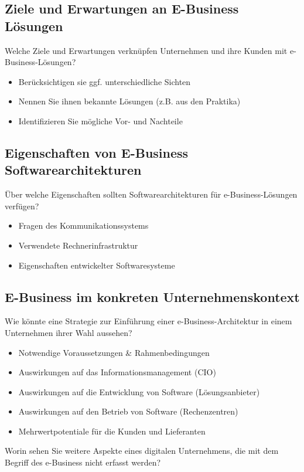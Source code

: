 \documentclass[notitlepage, hidelinks]{article}
\begin{document}
\subsection{Ziele und Erwartungen an E-Business Lösungen}
Welche Ziele und Erwartungen verknüpfen Unternehmen und ihre Kunden mit e-Business-Lösungen?
\begin{itemize}
\item Berücksichtigen sie ggf. unterschiedliche Sichten
\item Nennen Sie ihnen bekannte Lösungen (z.B. aus den Praktika)
\item Identifizieren Sie mögliche Vor- und Nachteile
\end{itemize}

\subsection{Eigenschaften von E-Business Softwarearchitekturen}
Über welche Eigenschaften sollten Softwarearchitekturen für e-Business-Lösungen verfügen?
\begin{itemize}
\item Fragen des Kommunikationssystems
\item Verwendete Rechnerinfrastruktur
\item Eigenschaften entwickelter Softwaresysteme
\end{itemize}

\subsection{E-Business im konkreten Unternehmenskontext}
Wie könnte eine Strategie zur Einführung einer e-Business-Architektur in einem Unternehmen ihrer Wahl aussehen?
\begin{itemize}
\item Notwendige Voraussetzungen \& Rahmenbedingungen
\item Auswirkungen auf das Informationsmanagement (CIO)
\item Auswirkungen auf die Entwicklung von Software (Lösungsanbieter)
\item Auswirkungen auf den Betrieb von Software (Rechenzentren)
\item Mehrwertpotentiale für die Kunden und Lieferanten
\end{itemize}

Worin sehen Sie weitere Aspekte eines digitalen Unternehmens, die mit dem Begriff des e-Business nicht erfasst werden?
\end{document}
